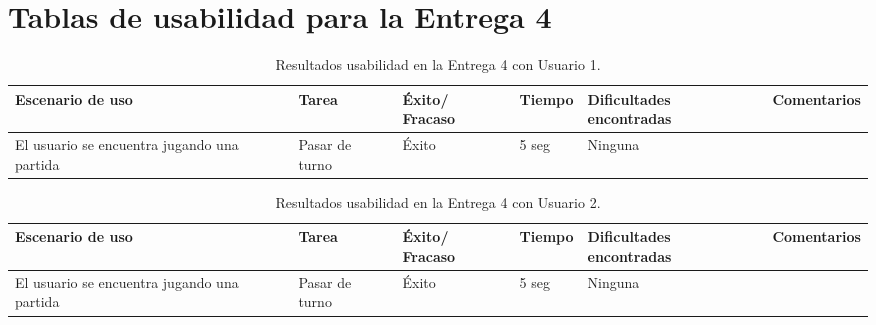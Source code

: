 \section{Tablas de usabilidad para la Entrega 4} \label{tablas-usabilidad-entrega-4}

\begin{table}[h]
  \begin{center}
    \begin{tabular}{|p{2.5cm}|p{1.75cm}|p{1.25cm}|p{1.25cm}|p{2.75cm}|p{3.5cm}|}

      \hline
        \rowcolor{Gray} \textbf{Escenario de uso}
        & \textbf{Tarea}
        & \textbf{Éxito/ Fracaso}
        & \textbf{Tiempo}
        & \textbf{Dificultades encontradas}
        & \textbf{Comentarios}\\

        \hline
        El usuario se encuentra jugando una partida
        & Pasar de turno
        & Éxito
        & 5 seg
        & Ninguna
        &\\

      \hline

    \end{tabular}

    \caption{Resultados usabilidad en la Entrega 4 con Usuario 1.}
    \label{tabla-entrega-4-usuario1}

  \end{center}
\end{table}


\begin{table}[h]
  \begin{center}
    \begin{tabular}{|p{2.5cm}|p{1.75cm}|p{1.25cm}|p{1.25cm}|p{2.75cm}|p{3.5cm}|}

      \hline
        \rowcolor{Gray} \textbf{Escenario de uso}
        & \textbf{Tarea}
        & \textbf{Éxito/ Fracaso}
        & \textbf{Tiempo}
        & \textbf{Dificultades encontradas}
        & \textbf{Comentarios}\\

        \hline
        El usuario se encuentra jugando una partida
        & Pasar de turno
        & Éxito
        & 5 seg
        & Ninguna
        &\\

      \hline

    \end{tabular}

    \caption{Resultados usabilidad en la Entrega 4 con Usuario 2.}
    \label{tabla-entrega-4-usuario2}

  \end{center}
\end{table}


